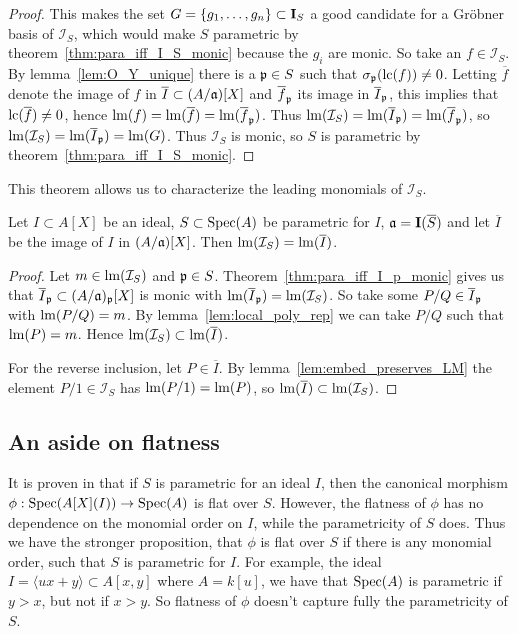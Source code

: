 \begin{proof}
  This makes the set $G = \{g_{1}, \dots, g_{n}\} \subset \operatorname{\mathbf I}_{S}$ a good candidate for a Gröbner basis of $\mathcal I_{S}$, which would make $S$ parametric by theorem~\ref{thm:para_iff_I_S_monic} because the $g_{i}$ are monic. So take an $f \in \mathcal I_{S}$. By lemma~\ref{lem:O_Y_unique} there is a $\mathfrak p \in S$ such that $\sigma_{\mathfrak p}(\operatorname{lc}(f)) \neq 0$. Letting $\overline f$ denote the image of $f$ in $\overline I \subset (A/\mathfrak{a})[X]$ and $\overline f_{\mathfrak p}$ its image in $\overline I_{\mathfrak p}$, this implies that $\operatorname{lc}(\overline f) \neq 0$, hence $\operatorname{lm}(f) = \operatorname{lm}(\overline f) = \operatorname{lm}(\overline f_{\mathfrak p})$. Thus $\operatorname{lm}(\mathcal I_{S}) = \operatorname{lm}(\overline I_{\mathfrak p}) = \operatorname{lm}(\overline f_{\mathfrak p})$, so $\operatorname{lm}(\mathcal I_{S}) = \operatorname{lm}(\overline I_{\mathfrak p}) = \operatorname{lm}(G)$. Thus $\mathcal I_{S}$ is monic, so $S$ is parametric by theorem~\ref{thm:para_iff_I_S_monic}.
\end{proof}

This theorem allows us to characterize the leading monomials of $\mathcal I_{S}$.

\begin{corollary}\label{cor:LM_I_S_eq_LM_overline_I}
  Let $I \subset A[X]$ be an ideal, $S \subset \operatorname{Spec}(A)$ be parametric for $I$, $\mathfrak{a} = \operatorname{\mathbf I}(\overline S)$ and let $\overline I$ be the image of $I$ in $(A/\mathfrak{a})[X]$. Then $\operatorname{lm}(\mathcal I_{S}) = \operatorname{lm}(\overline I)$.
\end{corollary}
\begin{proof}
  Let $m \in \operatorname{lm}(\mathcal I_{S})$ and $\mathfrak p \in S$. Theorem~\ref{thm:para_iff_I_p_monic} gives us that $\overline I_{\mathfrak p} \subset (A/\mathfrak{a})_{\mathfrak p}[X]$ is monic with $\operatorname{lm}(\overline I_{\mathfrak p}) = \operatorname{lm}(\mathcal I_{S})$. So take some $P/Q \in \overline I_{\mathfrak p}$ with $\operatorname{lm}(P/Q) = m$. By lemma~\ref{lem:local_poly_rep} we can take $P/Q$ such that $\operatorname{lm}(P) = m$. Hence $\operatorname{lm}(\mathcal I_{S}) \subset \operatorname{lm}(\overline I)$.

  For the reverse inclusion, let $P \in \overline I$. By lemma~\ref{lem:embed_preserves_LM} the element $P/1 \in \mathcal I_{S}$ has $\operatorname{lm}(P/1) = \operatorname{lm}(P)$, so $\operatorname{lm}(\overline I) \subset \operatorname{lm}(\mathcal I_{S})$.
\end{proof}










\subsection{An aside on flatness}
It is proven in \cite{grb_covers} that if $S$ is parametric for an ideal $I$, then the canonical morphism $\phi : \operatorname{Spec}(A[X](I)) \to \operatorname{Spec}(A)$ is flat over $S$. However, the flatness of $\phi$ has no dependence on the monomial order on $I$, while the parametricity of $S$ does. Thus we have the stronger proposition, that $\phi$ is flat over $S$ if there is any monomial order, such that $S$ is parametric for $I$. For example, the ideal $I = \langle ux + y \rangle \subset A[x, y]$ where $A = k[u]$, we have that $\operatorname{Spec}(A)$ is parametric if $y > x$, but not if $x > y$. So flatness of $\phi$ doesn't capture fully the parametricity of $S$.

